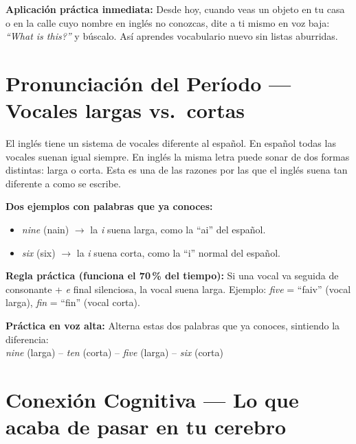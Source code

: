 \medskip\noindent
\textbf{Aplicación práctica inmediata:}
Desde hoy, cuando veas un objeto en tu casa o en la calle cuyo
nombre en inglés no conozcas, dite a ti mismo en voz baja:
\textit{``What is this?''} y búscalo.  Así aprendes vocabulario
nuevo sin listas aburridas.

\section*{Pronunciación del Período — Vocales largas vs.\ cortas}
\label{sec:pronunciacion_periodo2}

\noindent
El inglés tiene un sistema de vocales diferente al español.
En español todas las vocales suenan igual siempre.
En inglés la misma letra puede sonar de dos formas distintas:
larga o corta.  Esta es una de las razones por las que el inglés
suena tan diferente a como se escribe.

\medskip\noindent
\textbf{Dos ejemplos con palabras que ya conoces:}

\begin{itemize}
  \item \textit{nine} (nain) $\rightarrow$ la \textit{i} suena larga,
        como la ``ai'' del español.
  \item \textit{six} (six) $\rightarrow$ la \textit{i} suena corta,
        como la ``i'' normal del español.
\end{itemize}

\medskip\noindent
\textbf{Regla práctica (funciona el 70\,\% del tiempo):}
Si una vocal va seguida de consonante + \textit{e} final silenciosa,
la vocal suena larga.  Ejemplo: \textit{five} = ``faiv'' (vocal larga),
\textit{fin} = ``fin'' (vocal corta).

\medskip\noindent
\textbf{Práctica en voz alta:}
Alterna estas dos palabras que ya conoces, sintiendo la diferencia:\\
\textit{nine} (larga) \quad -- \quad \textit{ten} (corta) \quad
-- \quad \textit{five} (larga) \quad -- \quad \textit{six} (corta)

\section*{Conexión Cognitiva — Lo que acaba de pasar en tu cerebro}
\label{sec:motivacion_periodo2}

